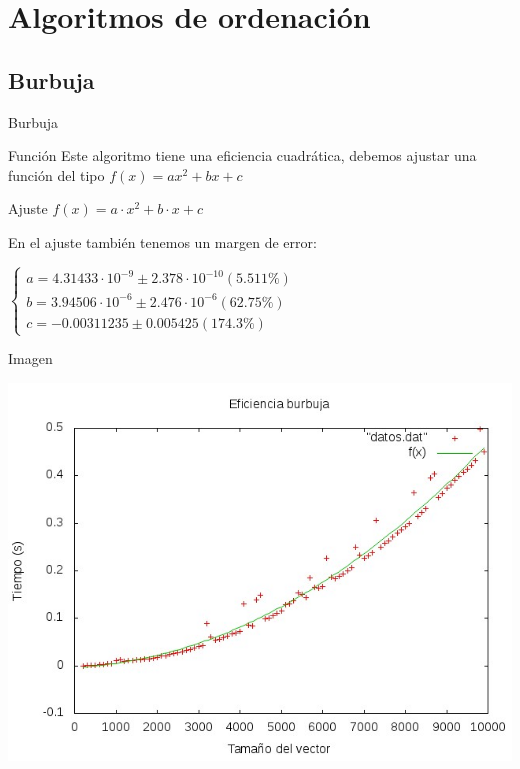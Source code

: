 \documentclass[compress]{beamer}
\begin{document}
\section{Algoritmos de ordenación}
\subsection{Burbuja}
\begin{frame}{Burbuja}
	\begin{block}{Función}
	Este algoritmo tiene una eficiencia cuadrática, debemos ajustar una función del tipo
	$f(x)= ax^2 + bx +c$
	\end{block}
	\pause

	\begin{block}{Ajuste}
	$f(x) = a\cdot x^2 + b\cdot x + c$
	
	En el ajuste también tenemos un margen de error:
	
	$\left\{ \begin{array}{c}
	a               = 4.31433\cdot 10^{-9}      \pm 2.378\cdot 10^{-10}    (5.511\%) \\
	b               = 3.94506\cdot 10^{-6}      \pm 2.476\cdot 10^{-6}    (62.75\%) \\
	c               = -0.00311235     \pm 0.005425     (174.3\%)
	\end{array}\right.$
	\end{block}
\end{frame}

\begin{frame}	
	\begin{alertblock}{Imagen}
	\begin{center}
	\includegraphics[scale=0.55]{../Graficas/Burbuja/burbujaO0_ruben.jpeg}
	\end{center}
	\end{alertblock}
\end{frame}
\end{document}
